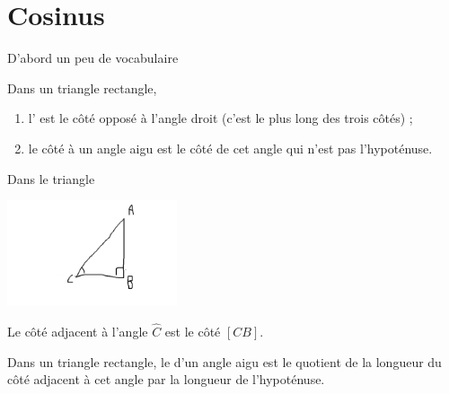 


\section{Cosinus}

D'abord un peu de vocabulaire

\begin{definition}
Dans un triangle rectangle,
\begin{enumerate}
    \item
        l' est le côté opposé à l'angle droit (c'est le plus long des trois côtés) ;
\item
    le côté  à un angle aigu est le côté de cet angle qui n'est pas l'hypoténuse.
\end{enumerate}
\end{definition}

\begin{example}
    Dans le triangle
    \begin{center}
        \includegraphics[width=5cm]{faux_ex_adj.pdf}
    \end{center}
    Le côté adjacent à l'angle \( \hat C\) est le côté \( [CB]\).
\end{example}

\begin{definition}
    Dans un triangle rectangle, le  d'un angle aigu est le quotient de la longueur du côté adjacent à cet angle par la longueur de l'hypoténuse.
\end{definition}

